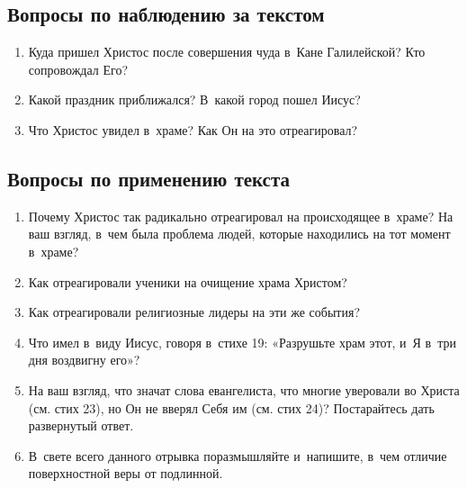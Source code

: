 \documentclass[a4paper,12pt]{article}
\begin{document}
\subsection*{Вопросы по наблюдению за текстом}
\begin{enumerate}
    \item Куда пришел Христос после совершения чуда в~Кане Галилейской? Кто сопровождал Его? 
    
    \myline
    
    \myline
    \item Какой праздник приближался? В~какой город пошел Иисус? 
    
    \myline
   
    \myline
    \item Что Христос увидел в~храме? Как Он на это отреагировал?
    
    \myline
    
    \myline
\end{enumerate}

\subsection*{Вопросы по применению текста} 
\begin{enumerate}
    \item Почему Христос так радикально отреагировал на происходящее в~храме? На ваш взгляд, в~чем была проблема людей, которые находились на тот момент в~храме? 
    
    \myline
    
    \myline
    \item Как отреагировали ученики на очищение храма Христом?
    
    \myline
    
    \myline
    \item Как отреагировали религиозные лидеры на эти же события? 
    
    \myline
    
    \myline
    \item Что имел в~виду Иисус, говоря в~стихе 19: «Разрушьте храм этот, и~Я в~три дня воздвигну его»? 
    
    \myline
    
    \myline
    \item На ваш взгляд, что значат слова евангелиста, что многие уверовали во Христа (см. стих 23), но Он не вверял Себя им (см. стих 24)? Постарайтесь дать развернутый ответ. 
    
    \myline
    
    \myline
    \item В~свете всего данного отрывка поразмышляйте и~напишите, в~чем отличие поверхностной веры от подлинной.
    
    \myline
    
    \myline
\end{enumerate}
\end{document}
